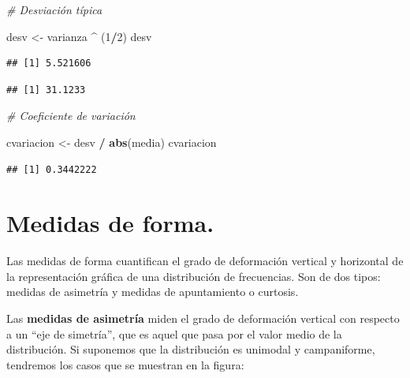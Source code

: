 \documentclass[
]{book}
\newenvironment{Shaded}{\begin{snugshade}}{\end{snugshade}}
\newcommand{\CommentTok}[1]{\textcolor[rgb]{0.56,0.35,0.01}{\textit{#1}}}
\newcommand{\DecValTok}[1]{\textcolor[rgb]{0.00,0.00,0.81}{#1}}
\newcommand{\FunctionTok}[1]{\textcolor[rgb]{0.13,0.29,0.53}{\textbf{#1}}}
\newcommand{\NormalTok}[1]{#1}
\newcommand{\OtherTok}[1]{\textcolor[rgb]{0.56,0.35,0.01}{#1}}
\newcommand{\SpecialCharTok}[1]{\textcolor[rgb]{0.81,0.36,0.00}{\textbf{#1}}}
\begin{document}
\begin{Shaded}
\begin{Highlighting}[]
\CommentTok{\# Desviación típica}

\NormalTok{desv }\OtherTok{\textless{}{-}}\NormalTok{ varianza }\SpecialCharTok{\^{}}\NormalTok{ (}\DecValTok{1}\SpecialCharTok{/}\DecValTok{2}\NormalTok{)}
\NormalTok{desv}
\end{Highlighting}
\end{Shaded}

\begin{verbatim}
## [1] 5.521606
\end{verbatim}

\begin{Shaded}
\end{Shaded}

\begin{verbatim}
## [1] 31.1233
\end{verbatim}

\begin{Shaded}
\begin{Highlighting}[]
\CommentTok{\# Coeficiente de variación}

\NormalTok{cvariacion }\OtherTok{\textless{}{-}}\NormalTok{ desv }\SpecialCharTok{/} \FunctionTok{abs}\NormalTok{(media)}
\NormalTok{cvariacion}
\end{Highlighting}
\end{Shaded}

\begin{verbatim}
## [1] 0.3442222
\end{verbatim}

\section{Medidas de forma.}\label{medidas-de-forma.}

Las medidas de forma cuantifican el grado de deformación vertical y horizontal de la representación gráfica de una distribución de frecuencias.
Son de dos tipos: medidas de asimetría y medidas de apuntamiento o curtosis.

Las \textbf{medidas de asimetría} miden el grado de deformación vertical con respecto a un ``eje de simetría'', que es aquel que pasa por el valor medio de la distribución.
Si suponemos que la distribución es unimodal y campaniforme, tendremos los casos que se muestran en la figura:
\end{document}
